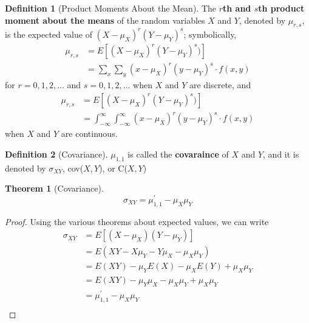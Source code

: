 \documentclass[
10pt,reqno
]{amsart}
\newtheorem{theorem}{Theorem}[section]
\theoremstyle{definition}
\newtheorem{definition}{Definition}[section]
\begin{document}
\begin{definition}[Product Moments About the Mean]
The \textbf{\(r\)th and \(s\)th product moment about the means} of the random variables \(X\) and \(Y\), denoted by \(\mu_{r,s}\), is the expected value of \((X-\mu_X)^r (Y - \mu_Y)^s\); symbolically,
\begin{align*}
\mu_{r,s} &= E[(X- \mu_X)^r (Y - \mu_Y)^s)]\\
&=\sum_x \sum_y (x - \mu_X)^r (y - \mu_Y)^s \cdot f(x,y)
\end{align*}
for \(r=0,1,2, \ldots \) and \(s=0,1,2,\ldots\) when \(X\) and \(Y\) are discrete, and
\begin{align*}
\mu_{r,s} &= E[(X- \mu_X)^r (Y - \mu_Y)^s)]\\
&= \int_{- \infty}^{\infty} \int_{- \infty}^{\infty} (x - \mu_X)^r (y - \mu_Y)^s \cdot f(x,y)
\end{align*}
when \(X\) and \(Y\) are continuous.
\end{definition}

\begin{definition}[Covariance]
\(\mu_{1,1}\) is called the \textbf{covaraince} of \(X\) and \(Y\), and it is denoted by \(\sigma_{XY}\), cov(\(X,Y\)), or C(\(X,Y\))
\end{definition}

\begin{theorem}[Covariance]
\[
\sigma_{XY} = \mu_{1,1}^{'}-\mu_{X} \mu_{Y}
\]
\end{theorem}

\begin{proof}
Using the various theorems about expected values, we can write
\begin{align*}
\sigma_{XY} &= E[(X-\mu_X)(Y-\mu_Y)]\\
&=E(XY-X \mu_Y - Y \mu_X - \mu_X \mu_Y)\\
&=E(XY) - \mu_Y E(X)-\mu_X E(Y) +\mu_X \mu_Y\\
&=E(XY) - \mu_Y \mu_X-\mu_X \mu_Y  +\mu_X \mu_Y\\
&=\mu_{1,1}^{'}-\mu_{X} \mu_{Y}\\
\end{align*}
\end{proof}
\end{document}
